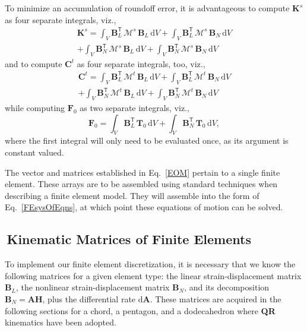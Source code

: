 To minimize an accumulation of roundoff error, it is advantageous to compute $\mathbf{K}^s$ as four separate integrals, viz.,
\begin{multline*}
\mathbf{K}^s = \int_V \mathbf{B}_L^{\mathsf{T}} \, 
\boldsymbol{\mathcal{M}}^s \, \mathbf{B}_L \, \mathrm{d}V + 
\int_V \mathbf{B}_L^{\mathsf{T}} \, \boldsymbol{\mathcal{M}}^s \, 
\mathbf{B}_N \, \mathrm{d}V \\ + 
\int_V \mathbf{B}_N^{\mathsf{T}} \, \boldsymbol{\mathcal{M}}^s \, 
\mathbf{B}_L \, \mathrm{d}V + 
\int_V \mathbf{B}_N^{\mathsf{T}} \, \boldsymbol{\mathcal{M}}^s \, 
\mathbf{B}_N \, \mathrm{d}V
\end{multline*}
and to compute $\mathbf{C}^t$ as four separate integrals, too, viz.,
\begin{multline*}
\mathbf{C}^t = \int_V \mathbf{B}_L^{\mathsf{T}} \, 
\boldsymbol{\mathcal{M}}^t \, \mathbf{B}_L \, \mathrm{d}V + 
\int_V \mathbf{B}_L^{\mathsf{T}} \, \boldsymbol{\mathcal{M}}^t \, 
\mathbf{B}_N \, \mathrm{d}V \\ + 
\int_V \mathbf{B}_N^{\mathsf{T}} \, \boldsymbol{\mathcal{M}}^t \, 
\mathbf{B}_L \, \mathrm{d}V + 
\int_V \mathbf{B}_N^{\mathsf{T}} \, \boldsymbol{\mathcal{M}}^t \, 
\mathbf{B}_N \, \mathrm{d}V
\end{multline*}
while computing $\boldsymbol{F}_0$ as two separate integrals, viz.,
\begin{equation*}
    \boldsymbol{F}_0 = \int_V \mathbf{B}_L^{\mathsf{T}} \, 
        \boldsymbol{T}_0 \, \mathrm{d}V + 
        \int_V \mathbf{B}_N^{\mathsf{T}} \, 
        \boldsymbol{T}_0 \, \mathrm{d}V ,
\end{equation*}
where the first integral will only need to be evaluated once, as its argument is constant valued.

The vector and matrices established in Eq.~\ref{EOM} pertain to a single finite element.  These arrays are to be assembled using standard techniques \cite{ClaytonChung18} when describing a finite element model.  They will assemble into the form of Eq.~\ref{FEsysOfEqns}, at which point these equations of motion can be solved.


\subsection{$\,$Kinematic Matrices of Finite Elements}

To implement our finite element discretization, it is necessary that we know the following matrices for a given element type: the linear strain-displacement matrix $\mathbf{B}_L$, the nonlinear strain-displacement matrix $\mathbf{B}_N$, and its decomposition $\mathbf{B}_N = \mathbf{AH}$, plus the differential rate $\mathrm{d}\mathbf{A}$.  These matrices are acquired in the following sections for a chord, a pentagon, and a dodecahedron where \textbf{QR} kinematics have been adopted.

